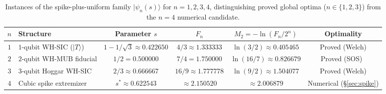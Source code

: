 \documentclass[11pt,a4paper]{article}
\theoremstyle{plain}
\theoremstyle{definition}
\theoremstyle{remark}
\newcommand{\ket}[1]{|#1\rangle}
\numberwithin{equation}{section}
\begin{document}
\begin{table}[htbp]
\centering
\caption{Instances of the spike-plus-uniform family $\ket{\psi_n(s)}$ for $n = 1, 2, 3, 4$, distinguishing proved global optima ($n \in \{1, 2, 3\}$) from the $n = 4$ numerical candidate.}\label{tab:spike-summary}
\smallskip
\footnotesize
\setlength{\tabcolsep}{3.0pt}
\renewcommand{\arraystretch}{1.18}
\begin{tabular}{@{}clcccc@{}}
\toprule
$n$ & Structure & Parameter $s$ & $F_n$ & $M_2 = -\ln(F_n/2^n)$ & Optimality \\
\midrule
$1$ & $1$-qubit WH-SIC ($\ket{T}$) & $1 - 1/\sqrt{3} \approx 0.422650$ & $4/3 \approx 1.333333$ & $\ln(3/2) \approx 0.405465$ & Proved (Welch) \\
$2$ & $2$-qubit WH-MUB fiducial & $1/2 = 0.500000$ & $7/4 = 1.750000$ & $\ln(16/7) \approx 0.826679$ & Proved (SOS)~\cite{ye2026twoqubit} \\
$3$ & $3$-qubit Hoggar WH-SIC & $2/3 \approx 0.666667$ & $16/9 \approx 1.777778$ & $\ln(9/2) \approx 1.504077$ & Proved (Welch) \\
$4$ & Cubic spike extremizer & $s^* \approx 0.622543$ & $\approx 2.150520$ & $\approx 2.006879$ & Numerical (\S\ref{sec:spike}) \\
\bottomrule
\end{tabular}
\end{table}
\end{document}
